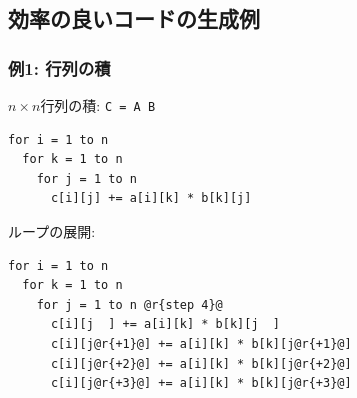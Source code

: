 \documentclass[dvipdfmx,cjk,xcolor=dvipsnames,envcountsect,notheorems,12pt,handout]{beamer} \usepackage{pgfpages} \pgfpagesuselayout{4 on 1}[a4paper,landscape,border shrink=5mm]
\theoremstyle{definition}
\begin{document}



\subsection{効率の良いコードの生成例}

\begin{frame}[fragile]
  \frametitle{例1: 行列の積}
  $n \times n$行列の積: \lstinline|C = A B|
\begin{lstlisting}
for i = 1 to n
  for k = 1 to n
    for j = 1 to n
      c[i][j] += a[i][k] * b[k][j]
\end{lstlisting}
  \pause
  ループの展開:
\begin{lstlisting}
for i = 1 to n
  for k = 1 to n
    for j = 1 to n @r{step 4}@
      c[i][j  ] += a[i][k] * b[k][j  ]
      c[i][j@r{+1}@] += a[i][k] * b[k][j@r{+1}@]
      c[i][j@r{+2}@] += a[i][k] * b[k][j@r{+2}@]
      c[i][j@r{+3}@] += a[i][k] * b[k][j@r{+3}@]
\end{lstlisting}
\end{frame}
\end{document}
